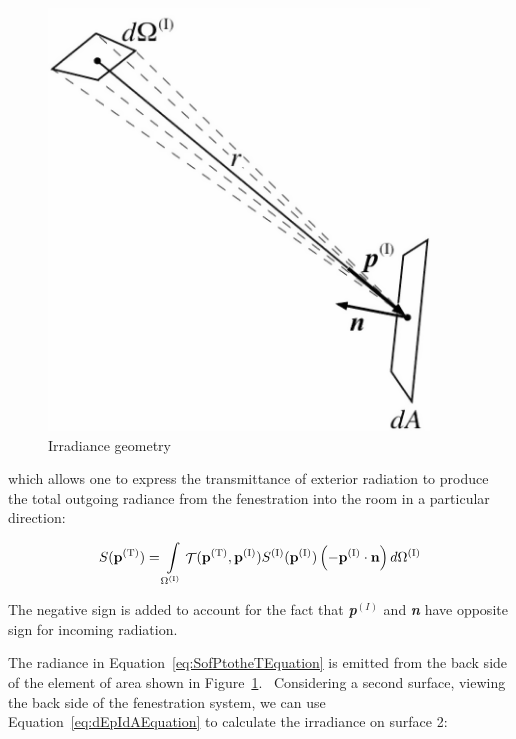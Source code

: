 \begin{figure}[hbtp] %
\centering
\includegraphics[width=0.9\textwidth, height=0.9\textheight, keepaspectratio=true]{media/image1271.png}
\caption{Irradiance geometry \protect \label{fig:irradiance-geometry}}
\end{figure}

which allows one to express the transmittance of exterior radiation to produce the total outgoing radiance from the fenestration into the room in a particular direction:

\begin{equation}
S({{\bf{p}}^{{\rm{(T)}}}}) = \int\limits_{{\Omega ^{{\rm{(I)}}}}} {{\mathop{\rm \mathcal{T}}\nolimits} ({{\bf{p}}^{{\rm{(T)}}}},{{\bf{p}}^{{\rm{(I)}}}}){S^{{\rm{(I)}}}}({{\bf{p}}^{{\rm{(I)}}}})\left( { - {{\bf{p}}^{{\rm{(I)}}}}\cdot {\bf{n}}} \right)d{\Omega ^{{\rm{(I)}}}}}
\label{eq:SofPtotheTEquation}
\end{equation}

The negative sign is added to account for the fact that \textbf{\emph{p}}\(^{(I)}\) and \textbf{\emph{n}} have opposite sign for incoming radiation.

The radiance in Equation~\ref{eq:SofPtotheTEquation} is emitted from the back side of the element of area shown in Figure~\ref{fig:irradiance-geometry}.~ Considering a second surface, viewing the back side of the fenestration system, we can use Equation~\ref{eq:dEpIdAEquation} to calculate the irradiance on surface 2:

